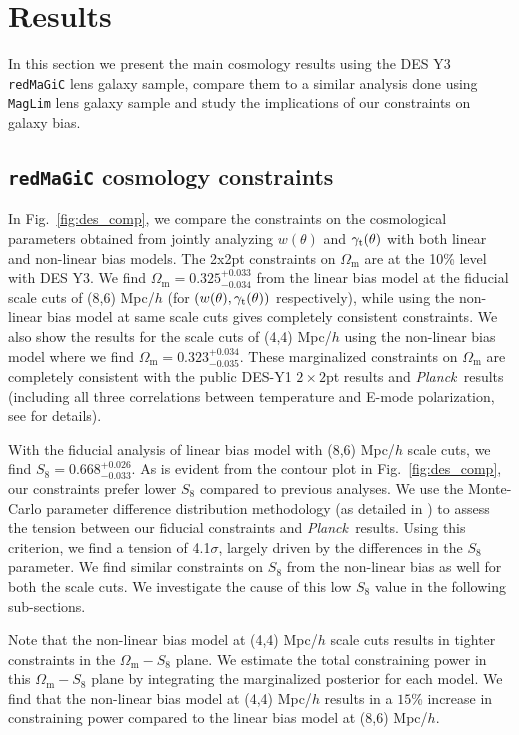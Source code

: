 \documentclass[aps, prd,twocolumn,superscriptaddress,nofootinbib,preprintnumbers]{revtex4-1}
\newcommand{\gammat}{\ensuremath{\gamma_{\rm t}(\theta)}}
\newcommand{\wtheta}{\ensuremath{w(\theta)}}
\newcommand{\om}{\ensuremath{\Omega_{\mathrm m}}}
\newcommand{\redmagic}{\texttt{redMaGiC} }
\newcommand{\maglim}{\texttt{MagLim} }
\newcommand{\Planck}{{\slshape Planck~}}
\begin{document}
\section{Results}
In this section we present the main cosmology results using the DES Y3 \redmagic lens galaxy sample, compare them to a similar analysis done using \maglim lens galaxy sample and study the implications of our constraints on  galaxy bias. 
\subsection{\redmagic cosmology constraints}

In Fig.~\ref{fig:des_comp}, we compare the constraints on the cosmological parameters obtained from jointly analyzing $\wtheta$ and $\gammat$ with both linear and non-linear bias models. The 2x2pt constraints on $\om$ are at the 10\% level with DES Y3. We find $\om = 0.325^{+0.033}_{-0.034}$ from the linear bias model at the fiducial scale cuts of (8,6) Mpc/$h$ (for $(w(\theta),\gamma_{\rm t}(\theta))$ respectively), while using the non-linear bias model at same scale cuts gives completely consistent constraints.
We also show the results for the scale cuts of (4,4) Mpc/$h$ using the non-linear bias model where we find $\om=0.323^{+0.034}_{-0.035}$. These marginalized constraints on $\om$ are completely consistent with the public DES-Y1  $2\times 2$pt results \citep{Abbott_2018} and \Planck results (including all  three correlations between temperature and E-mode polarization, see \citet{Planck_2018_cosmo} for details). 

With the fiducial analysis of linear bias model with (8,6) Mpc/$h$ scale cuts, we find $S_8 = 0.668^{+0.026}_{-0.033}$. As is evident from the contour plot in Fig.~\ref{fig:des_comp}, our constraints prefer lower $S_8$ compared to previous analyses.  We use the Monte-Carlo parameter difference distribution methodology (as detailed in \citealt{y3-tensions}) to assess the tension between our fiducial constraints and \Planck results. Using this criterion, we find a tension of 4.1$\sigma$, largely driven by the differences in the $S_8$ parameter. We find similar constraints on $S_8$ from the non-linear bias as well for both the scale cuts. We investigate the cause of this low $S_8$ value in the following sub-sections. 

Note that the non-linear bias model at (4,4) Mpc/$h$ scale cuts results in tighter constraints in the $\om-S_8$ plane. We estimate the total constraining power in this $\om-S_8$ plane by integrating the marginalized posterior for each model. 
We find that the non-linear bias model at  (4,4) Mpc/$h$ results in a $15$\% increase in constraining power compared to the linear bias model at (8,6) Mpc/$h$. 
\end{document}
